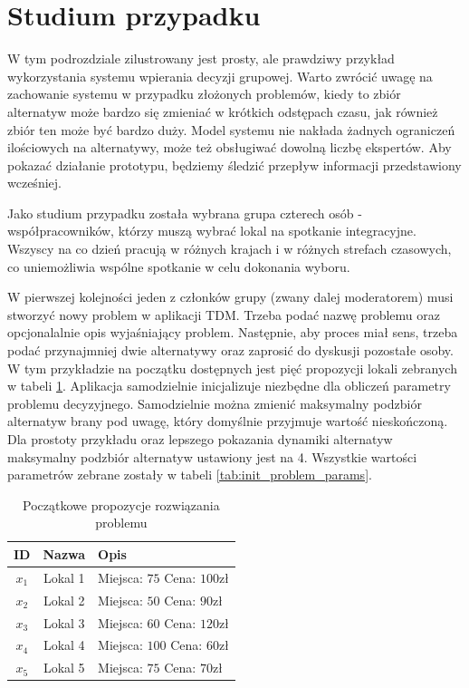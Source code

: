 \section{Studium przypadku}
W tym podrozdziale zilustrowany jest prosty, ale prawdziwy przykład
wykorzystania systemu wpierania decyzji grupowej. Warto zwrócić uwagę na
zachowanie systemu w przypadku złożonych problemów, kiedy to zbiór alternatyw
może bardzo się zmieniać w krótkich odstępach czasu, jak również zbiór ten może
być bardzo duży. Model systemu nie nakłada żadnych ograniczeń ilościowych na
alternatywy, może też obsługiwać dowolną liczbę ekspertów. Aby pokazać działanie
prototypu, będziemy śledzić przepływ informacji przedstawiony wcześniej.

Jako studium przypadku została wybrana grupa czterech osób - współpracowników,
którzy muszą wybrać lokal na spotkanie integracyjne. Wszyscy na co dzień
pracują w różnych krajach i w różnych strefach czasowych, co uniemożliwia
wspólne spotkanie w celu dokonania wyboru.

W pierwszej kolejności jeden z członków grupy (zwany dalej moderatorem) musi
stworzyć nowy problem w aplikacji TDM. Trzeba podać nazwę problemu oraz
opcjonalalnie opis wyjaśniający problem. Następnie, aby proces miał sens, trzeba
podać przynajmniej dwie alternatywy oraz zaprosić do dyskusji pozostałe osoby. W
tym przykładzie na początku dostępnych jest pięć propozycji lokali zebranych w
tabeli \ref{tab:init_ideas}.
Aplikacja samodzielnie inicjalizuje niezbędne dla obliczeń parametry problemu
decyzyjnego. Samodzielnie można zmienić maksymalny podzbiór alternatyw brany pod
uwagę, który domyślnie przyjmuje wartość nieskończoną. Dla prostoty przykładu
oraz lepszego pokazania dynamiki alternatyw maksymalny podzbiór alternatyw
ustawiony jest na 4. Wszystkie wartości parametrów zebrane zostały w tabeli
\ref{tab:init_problem_params}.

\begin{table}[ht]
\caption{Początkowe propozycje rozwiązania problemu}
\begin{tabularx}{\textwidth}{|c|c|X|}
\hline
ID & Nazwa & Opis \\
\hline
$x_1$ & Lokal 1 & Miejsca: $75$ Cena: $100\textrm{zł}$ \\
\hline
$x_2$ & Lokal 2 & Miejsca: $50$ Cena: $90\textrm{zł}$ \\
\hline
$x_3$ & Lokal 3 & Miejsca: $60$ Cena: $120\textrm{zł}$ \\
\hline
$x_4$ & Lokal 4 & Miejsca: $100$ Cena: $60\textrm{zł}$ \\
\hline
$x_5$ & Lokal 5 & Miejsca: $75$ Cena: $70\textrm{zł}$ \\
\hline
\end{tabularx}
\label{tab:init_ideas}
\end{table}

